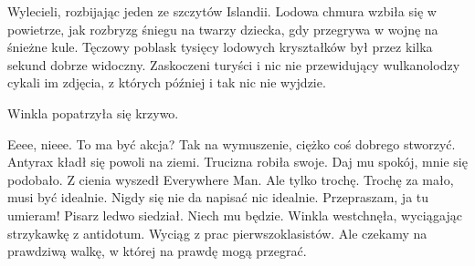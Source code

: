 Wylecieli, rozbijając jeden ze szczytów Islandii.
Lodowa chmura wzbiła się w powietrze, jak rozbryzg śniegu na twarzy dziecka, gdy przegrywa w wojnę na śnieżne kule.
Tęczowy poblask tysięcy lodowych kryształków był przez kilka sekund dobrze widoczny.
Zaskoczeni turyści i nic nie przewidujący wulkanolodzy cykali im zdjęcia, z których później i tak nic nie wyjdzie.

\divider{}

Winkla popatrzyła się krzywo.
\begin{dialogue}
\ds{} Eeee, nieee. To ma być akcja? 
\ds{} Tak na wymuszenie, ciężko coś dobrego stworzyć. \dm{} Antyrax kładł się powoli na ziemi. Trucizna robiła swoje.
\ds{} Daj mu spokój, mnie się podobało. \dm{} Z cienia wyszedł Everywhere Man. \dm{} Ale tylko trochę.
\ds{} Trochę za mało, musi być idealnie.
\ds{} Nigdy się nie da napisać nic idealnie.
\ds{} Przepraszam, ja tu umieram! \dm{} Pisarz ledwo siedział.
\ds{} Niech mu będzie. \dm{} Winkla westchnęła, wyciągając strzykawkę z antidotum. Wyciąg z prac pierwszoklasistów. \dm{} Ale czekamy na prawdziwą walkę, w której na prawdę mogą przegrać.
\end{dialogue}

\divider{}

